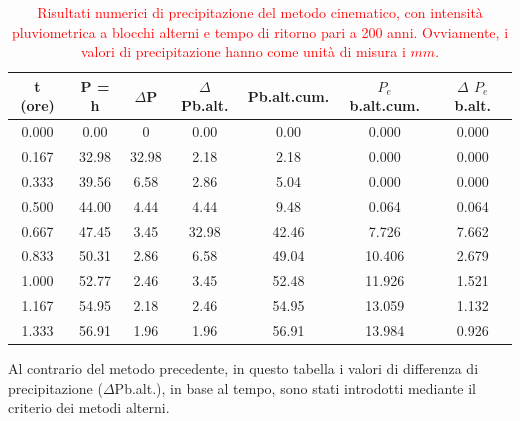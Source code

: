 \begin{table}[H] \centering
    \caption{\textcolor{red}{Risultati numerici di precipitazione del metodo cinematico, con intensità pluviometrica a blocchi alterni e tempo di ritorno pari a 200 anni. Ovviamente, i valori di precipitazione hanno come unità di misura i $mm$.}}
    \begin{tabular}{ccccccc}
        \toprule
    t (ore) & P = h & $\Delta$P & $\Delta$Pb.alt. & Pb.alt.cum. & $P_e$b.alt.cum.  & $\Delta$ $P_e$b.alt. \\
    \midrule
     0.000   & 0.00                 & 0                    & 0.00              & 0.00                & 0.000                & 0.000              \\
     0.167   & 32.98                & 32.98                & 2.18              & 2.18                & 0.000                & 0.000              \\
     0.333   & 39.56                & 6.58                 & 2.86              & 5.04                & 0.000                & 0.000              \\
     0.500   & 44.00                & 4.44                 & 4.44              & 9.48                & 0.064                & 0.064              \\
    0.667   & 47.45                & 3.45                 & 32.98             & 42.46               & 7.726                & 7.662              \\
    0.833   & 50.31                & 2.86                 & 6.58              & 49.04               & 10.406               & 2.679              \\
    1.000   & 52.77                & 2.46                 & 3.45              & 52.48               & 11.926               & 1.521              \\
    1.167   & 54.95                & 2.18                 & 2.46              & 54.95               & 13.059               & 1.132              \\
    1.333   & 56.91                & 1.96                 & 1.96              & 56.91               & 13.984               & 0.926             \\
    \bottomrule
    \end{tabular}
    \end{table}
Al contrario del metodo precedente, in questo tabella i valori di differenza di precipitazione ($\Delta$Pb.alt.), in base al tempo, sono stati introdotti mediante il criterio dei metodi alterni.

